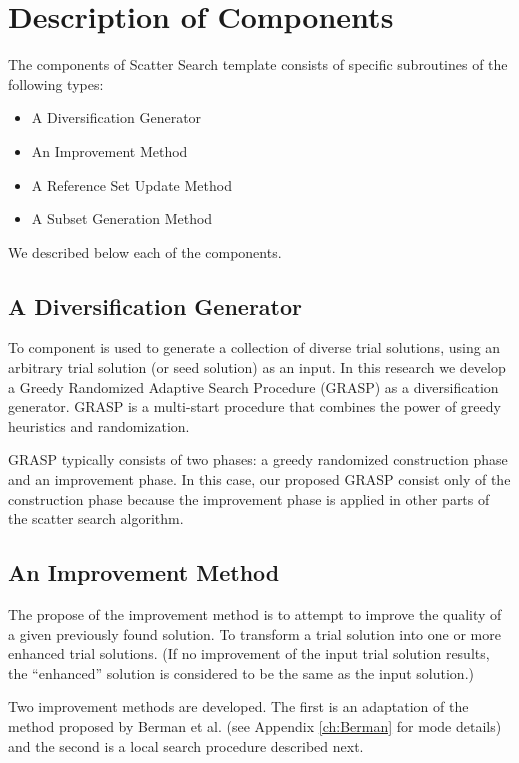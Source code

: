 \section{Description of Components}
The components of Scatter Search template \cite{glover1998template}
consists of
specific subroutines of the following types:
\begin{itemize}
\item A Diversification Generator
\item An Improvement Method
\item A Reference Set Update Method
\item A Subset Generation Method
\end{itemize}
We described below
each of the components.

\subsection{A Diversification Generator}
To component is used to generate
a collection of diverse trial solutions,
using an arbitrary trial solution
(or seed solution) as an input.
%
In this research
we develop a Greedy Randomized Adaptive Search Procedure (GRASP)
as a diversification generator.
GRASP \cite{feo1995greedy}
is a multi-start procedure that combines
the power of greedy heuristics and randomization.

GRASP typically consists of two phases:
a greedy randomized construction phase
and an improvement phase.
In this case,
our proposed GRASP
consist only of the construction phase
because the improvement phase
is applied in other parts
of the scatter search algorithm.


\subsection{An Improvement Method}
The propose of the improvement method
is to attempt to improve the quality
of a given previously found solution.
To transform a trial solution
into one or more
enhanced trial solutions.
(If no improvement
of the input trial solution results, 
the ``enhanced'' solution
is considered to be
the same as the input solution.)

Two improvement methods are developed.
The first is an adaptation
of the method proposed by Berman et al. \cite{berman1987stochastic}
(see Appendix \ref{ch:Berman} for mode details)
and the second
is a local search procedure
described next.


